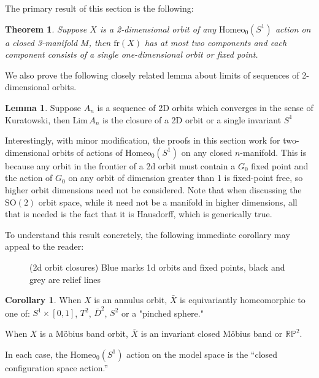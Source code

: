 \documentclass[10pt, oneside]{article}
\newcommand{\RP}{\mathbb{RP}}
\newcommand{\SO}[1][2]{\text{SO}(#1)}
\newcommand{\homeo}[1][S^1]{\text{Homeo}_0(#1)}
\newcommand{\klim}[1]{\text{Lim}\,#1}
\newtheorem{thm}{Theorem}[section]
\theoremstyle{definition}
\newtheorem{lem}{Lemma}[section]
\newtheorem{cor}{Corollary}[section]
\theoremstyle{definition}
\begin{document}
The primary result of this section is the following:

\begin{thm}\label{thm:2d-orbit-cpctification}
    Suppose $X$ is a 2-dimensional orbit of any $\homeo$ action on a closed 3-manifold $M$, then $\text{fr}(X)$ has at most two components and each component consists of a single one-dimensional orbit or fixed point.
\end{thm}

We also prove the following closely related lemma about limits of sequences of 2-dimensional orbits.

\begin{lem}\label{lem:seq-of-annuli}
    Suppose $A_n$ is a sequence of 2D orbits which converges in the sense of Kuratowski, then $\klim A_n$ is the closure of a 2D orbit or a single invariant $S^1$
\end{lem}

Interestingly, with minor modification, the proofs in this section work for two-dimensional orbits of actions of $\homeo$ on any closed $n$-manifold. This is because any orbit in the frontier of a 2d orbit must contain a $G_0$ fixed point and the action of $G_0$ on any orbit of dimension greater than 1 is fixed-point free, so higher orbit dimensions need not be considered. Note that when discussing the $\SO$ orbit space, while it need not be a manifold in higher dimensions, all that is needed is the fact that it is Hausdorff, which is generically true.

To understand this result concretely, the following immediate corollary
may appeal to the reader:

\begin{figure}[b]
    \centering
    
    \caption{(2d orbit closures) Blue marks 1d orbits and fixed points, black and grey are relief lines}
    \label{fig:2d-orbit-compactifications}
\end{figure}

\begin{cor}\label{cor:2d-orbit-closures}
    When $X$ is an annulus orbit, $\bar{X}$ is equivariantly homeomorphic to one of: $S^1\times [0,1]$, $T^2$, $\bar{D}^2$, $S^2$ or a "pinched sphere."

    When $X$ is a M\"{o}bius band orbit, $\bar{X}$ is an invariant closed M\"{o}bius band or $\RP^2$.

    In each case, the $\homeo$ action on the model space is the ``closed configuration space action.''
\end{cor}
\end{document}
